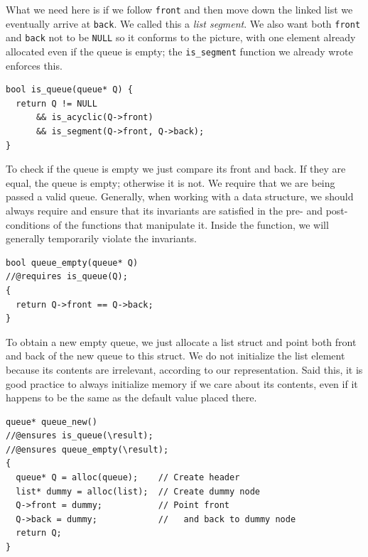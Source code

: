 What we need here is if we follow \lstinline'front' and then move down
the linked list we eventually arrive at \lstinline'back'.  We called
this a \emph{list segment}.  We also want both \lstinline'front' and
\lstinline'back' not to be \lstinline'NULL' so it conforms to the
picture, with one element already allocated even if the queue is
empty; the \lstinline'is_segment' function we already wrote enforces
this.
\begin{lstlisting}[language={[C0]C}]
bool is_queue(queue* Q) {
  return Q != NULL
      && is_acyclic(Q->front)
      && is_segment(Q->front, Q->back);
}
\end{lstlisting}

To check if the queue is empty we just compare its front and back.
If they are equal, the queue is empty; otherwise it is not.  We
require that we are being passed a valid queue.  Generally, when
working with a data structure, we should always require and ensure
that its invariants are satisfied in the pre- and post-conditions of
the functions that manipulate it.  Inside the function, we will
generally temporarily violate the invariants.
\begin{lstlisting}[language={[C0]C}]
bool queue_empty(queue* Q)
//@requires is_queue(Q);
{
  return Q->front == Q->back;
}
\end{lstlisting}
To obtain a new empty queue, we just allocate a list struct and point both
front and back of the new queue to this struct.  We do not initialize the list
element because its contents are irrelevant, according to our representation.
Said this, it is good practice to always initialize memory if we care about
its contents, even if it happens to be the same as the default value placed
there.
\begin{lstlisting}[language={[C0]C}]
queue* queue_new()
//@ensures is_queue(\result);
//@ensures queue_empty(\result);
{
  queue* Q = alloc(queue);    // Create header
  list* dummy = alloc(list);  // Create dummy node
  Q->front = dummy;           // Point front
  Q->back = dummy;            //   and back to dummy node
  return Q;
}
\end{lstlisting}

